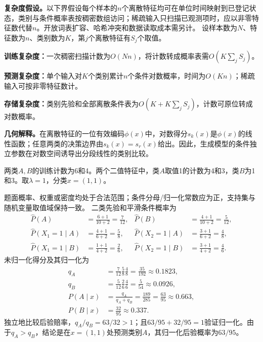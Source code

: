 \begin{complexitybox}
\textbf{复杂度假设。}以下界假设每个样本的$n$个离散特征均可在单位时间映射到已登记状态，类别与条件概率表按稠密数组访问；稀疏输入只扫描已观测项时，应以非零特征数代替$n$。开放词表扩容、哈希冲突和数据读取成本需另计。
设样本数为$N$、特征数为$n$、类别数为$K$，第$j$个离散特征有$S_j$个取值。

\textbf{训练复杂度：}一次稠密扫描计数为$O(Nn)$，将计数转成概率表需$O(K\sum_jS_j)$。

\textbf{预测复杂度：}单个输入对$K$个类别累计$n$个条件对数概率，时间为$O(Kn)$；稀疏输入可按非零特征数计。

\textbf{存储复杂度：}类别先验和全部离散条件表为$O(K+K\sum_jS_j)$，计数可原位转成对数概率。
\end{complexitybox}

\label{struct:V2-C03-CH14}
\begin{geometrybox}
\textbf{几何解释。}在离散特征的一位有效编码$\phi(x)$中，对数得分$s_k(x)$是$\phi(x)$的线性函数；任意两类的决策边界由$s_k(x)=s_r(x)$给出。因此，生成模型的条件独立参数在对数空间诱导出分段线性的类别比较。
\end{geometrybox}

\label{struct:V2-C03-CH18}
\label{struct:V2-C03-CH32}
\begin{example}[加一平滑后的朴素Bayes分类]\label{exm:V2-C03-smoothed-score}
两类$A,B$的训练计数为6和4。两个二值特征中，类$A$取值1的计数为4和3，类$B$为1和3。取$\lambda=1$，分类$x=(1,1)$。
\label{struct:V2-C03-CH33}
\end{example}
\begin{solution}
\SolGiven 题面概率、权重或密度均处于合法范围；条件分母/归一化常数应为正，支持集与随机变量取值域保持一致。
\SolDerive
二类先验和平滑条件概率为
\[
\begin{aligned}
\widehat P(A)&=\frac{6+1}{10+2}=\frac7{12},&
\widehat P(B)&=\frac{4+1}{10+2}=\frac5{12},\\
\widehat P(X_1=1\mid A)&=\frac{4+1}{6+2}=\frac58,&
\widehat P(X_2=1\mid A)&=\frac{3+1}{6+2}=\frac48,\\
\widehat P(X_1=1\mid B)&=\frac{1+1}{4+2}=\frac26,&
\widehat P(X_2=1\mid B)&=\frac{3+1}{4+2}=\frac46.
\end{aligned}
\]
未归一化得分及其归一化为
\[
\begin{aligned}
q_A&=\frac7{12}\frac58\frac48=\frac{35}{192}\approx0.1823,\\
q_B&=\frac5{12}\frac26\frac46=\frac5{54}\approx0.0926,\\
P(A\mid x)&=\frac{q_A}{q_A+q_B}=\frac{189}{285}=\frac{63}{95}\approx0.663,\\
P(B\mid x)&=\frac{32}{95}\approx0.337.
\end{aligned}
\]
独立地比较后验赔率，$q_A/q_B=63/32>1$；且$63/95+32/95=1$验证归一化。由于$q_A>q_B$，结论是在$x=(1,1)$处预测类别$A$，其归一化后验概率为$63/95$。
\end{solution}

